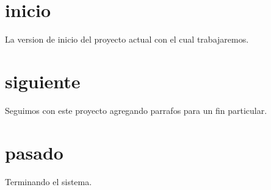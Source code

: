 \documentclass[a4paper]{article}
\begin{document}
\section{inicio}
La version de inicio del proyecto actual con el cual trabajaremos.

\section{siguiente}
Seguimos con este proyecto agregando parrafos para un fin particular.

\section{pasado}
Terminando el sistema.
\end{document}
